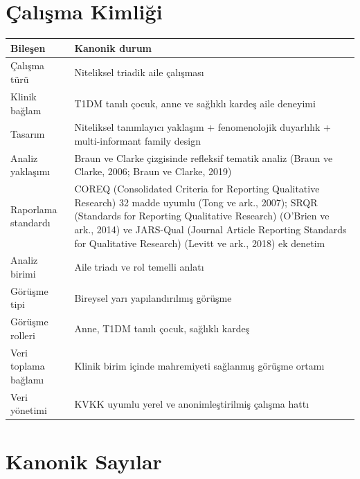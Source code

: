 \documentclass[
  turkish,
  a4paper,
  DIV=11,
  numbers=noendperiod]{scrreprt}
\newcounter{none} %
\begin{document}
\section{Çalışma Kimliği}\label{uxe7alux131ux15fma-kimliux11fi}

{\def\LTcaptype{none} %
\begin{longtable}[]{@{}
  >{\raggedright\arraybackslash}p{}
  >{\raggedright\arraybackslash}p{}@{}}
\toprule\noalign{}
\begin{minipage}[b]{\linewidth}\raggedright
Bileşen
\end{minipage} & \begin{minipage}[b]{\linewidth}\raggedright
Kanonik durum
\end{minipage} \\
\midrule\noalign{}
\endhead
\bottomrule\noalign{}
\endlastfoot
Çalışma türü & Niteliksel triadik aile çalışması \\
Klinik bağlam & T1DM tanılı çocuk, anne ve sağlıklı kardeş aile
deneyimi \\
Tasarım & Niteliksel tanımlayıcı yaklaşım + fenomenolojik duyarlılık +
multi-informant family design \\
Analiz yaklaşımı & Braun ve Clarke çizgisinde refleksif tematik analiz
(Braun ve Clarke, 2006; Braun ve Clarke, 2019) \\
Raporlama standardı & COREQ (Consolidated Criteria for Reporting
Qualitative Research) 32 madde uyumlu (Tong ve ark., 2007); SRQR
(Standards for Reporting Qualitative Research) (O'Brien ve ark., 2014)
ve JARS-Qual (Journal Article Reporting Standards for Qualitative
Research) (Levitt ve ark., 2018) ek denetim \\
Analiz birimi & Aile triadı ve rol temelli anlatı \\
Görüşme tipi & Bireysel yarı yapılandırılmış görüşme \\
Görüşme rolleri & Anne, T1DM tanılı çocuk, sağlıklı kardeş \\
Veri toplama bağlamı & Klinik birim içinde mahremiyeti sağlanmış görüşme
ortamı \\
Veri yönetimi & KVKK uyumlu yerel ve anonimleştirilmiş çalışma hattı \\
\end{longtable}
}

\section{Kanonik Sayılar}\label{kanonik-sayux131lar}
\end{document}
